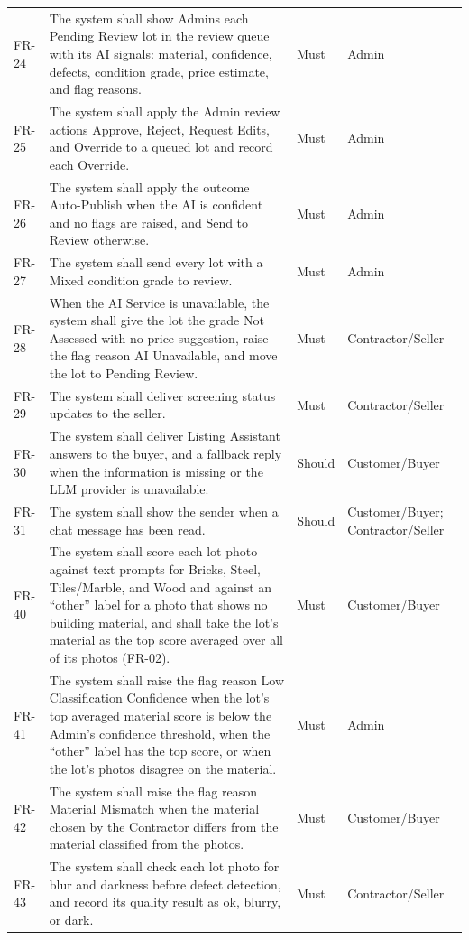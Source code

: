 {\begin{longtable}{@{}p{}p{}p{}p{}@{}}
FR-24 & The system shall show Admins each Pending Review lot in the review queue with its AI signals: material, confidence, defects, condition grade, price estimate, and flag reasons. & Must & Admin \\
FR-25 & The system shall apply the Admin review actions Approve, Reject, Request Edits, and Override to a queued lot and record each Override. & Must & Admin \\
FR-26 & The system shall apply the outcome Auto-Publish when the AI is confident and no flags are raised, and Send to Review otherwise. & Must & Admin \\
FR-27 & The system shall send every lot with a Mixed condition grade to review. & Must & Admin \\
FR-28 & When the AI Service is unavailable, the system shall give the lot the grade Not Assessed with no price suggestion, raise the flag reason AI Unavailable, and move the lot to Pending Review. & Must & Contractor/Seller \\
FR-29 & The system shall deliver screening status updates to the seller. & Must & Contractor/Seller \\
FR-30 & The system shall deliver Listing Assistant answers to the buyer, and a fallback reply when the information is missing or the LLM provider is unavailable. & Should & Customer/Buyer \\
FR-31 & The system shall show the sender when a chat message has been read. & Should & Customer/Buyer; Contractor/Seller \\
FR-40 & The system shall score each lot photo against text prompts for Bricks, Steel, Tiles/Marble, and Wood and against an ``other'' label for a photo that shows no building material, and shall take the lot's material as the top score averaged over all of its photos (FR-02). & Must & Customer/Buyer \\
FR-41 & The system shall raise the flag reason Low Classification Confidence when the lot's top averaged material score is below the Admin's confidence threshold, when the ``other'' label has the top score, or when the lot's photos disagree on the material. & Must & Admin \\
FR-42 & The system shall raise the flag reason Material Mismatch when the material chosen by the Contractor differs from the material classified from the photos. & Must & Customer/Buyer \\
FR-43 & The system shall check each lot photo for blur and darkness before defect detection, and record its quality result as ok, blurry, or dark. & Must & Contractor/Seller \\

\end{longtable}}
